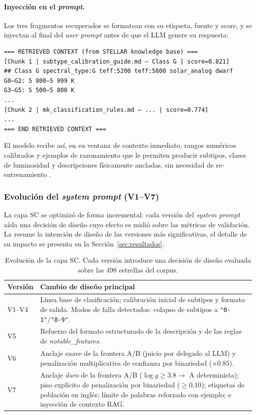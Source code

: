 \paragraph{Inyección en el \emph{prompt}.} Los tres fragmentos recuperados se
formatean con su etiqueta, fuente y score, y se inyectan al final del
\emph{user prompt} antes de que el LLM genere su respuesta:
\begin{verbatim}
=== RETRIEVED CONTEXT (from STELLAR knowledge base) ===
[Chunk 1 | subtype_calibration_guide.md — Class G | score=0.821]
## Class G spectral_type:G teff:5200 teff:5800 solar_analog dwarf
G0–G2: 5 800–5 999 K
G3–G5: 5 500–5 800 K
...
[Chunk 2 | mk_classification_rules.md — ... | score=0.774]
...
=== END RETRIEVED CONTEXT ===
\end{verbatim}
El modelo recibe así, en su ventana de contexto inmediato, rangos numéricos
calibrados y ejemplos de razonamiento que le permiten producir subtipos,
clases de luminosidad y descripciones físicamente ancladas, sin necesidad de
re-entrenamiento \citep{lewis2020rag}.

\subsubsection{Evolución del \emph{system prompt} (V1--V7)}
\label{sec:prompt-evol}

La capa SC se optimizó de forma incremental: cada versión del \emph{system prompt}
aísla una decisión de diseño cuyo efecto se midió sobre las métricas de validación.
La  resume la intención de diseño de las versiones más
significativas, el detalle de su impacto se presenta en la
Sección~\ref{sec:resultados}.

\begin{table}[H]
  \centering
  \caption{Evolución de la capa SC. Cada versión introduce una decisión de diseño
  evaluada sobre las \num{498} estrellas del corpus.}
  \label{tab:prompt-versions}
  \begin{tabularx}{\linewidth}{lX}
    \toprule
    Versión & Cambio de diseño principal \\
    \midrule
    V1--V4 & Línea base de clasificación; calibración inicial de subtipos y
    formato de salida. Modos de falla detectados: colapso de subtipos a
    \texttt{"0-1"}/\texttt{"8-9"}. \\
    V5     & Refuerzo del formato estructurado de la descripción y de las reglas de
    \emph{notable\_features}. \\
    V6     & Anclaje suave de la frontera A/B (juicio por \logg{} delegado al LLM) y
    penalización multiplicativa de confianza por binariedad ($\times 0.85$). \\
    V7     & Anclaje \emph{duro} de la frontera A/B ($\log g \ge 3.8 \to$ A
    determinista); piso explícito de penalización por binariedad ($\ge 0.10$);
    etiquetas de población en inglés; límite de palabras reforzado con ejemplo; e
    inyección de contexto RAG. \\
    \bottomrule
  \end{tabularx}
\end{table}



